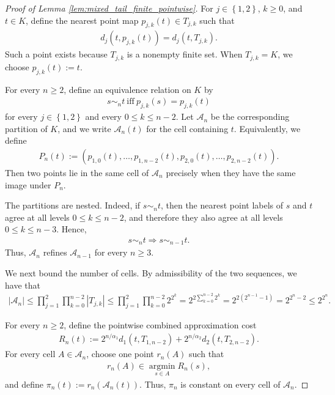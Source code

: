 \documentclass[10pt,a4paper]{amsart}
\newcommand{\cbr}[1]{\left\{#1\right\}}
\newcommand{\rbr}[1]{\left(#1\right)}
\begin{document}
\begin{proof}[Proof of Lemma
\ref{lem:mixed_tail_finite_pointwise}]
For $j\in\cbr{1,2}$, $k\ge0$, and $t\in K$, define the nearest point map $p_{j,k}(t)\in T_{j,k}$ such that
\begin{align*}
d_j(t,p_{j,k}(t))
=
d_j(t,T_{j,k}).
\end{align*}
Such a point exists because $T_{j,k}$ is a nonempty finite set. When
$T_{j,k}=K$, we choose $p_{j,k}(t):=t$.

For every $n\ge2$, define an equivalence relation on $K$ by
\begin{align*}
s\sim_n t\ \text{iff}\ p_{j,k}(s)=p_{j,k}(t)
\end{align*}
for every $j\in\cbr{1,2}$ and every $0\le k\le n-2$. Let
$\mathcal A_n$ be the corresponding partition of $K$, and we write
$\mathcal A_n(t)$ for the cell containing $t$. Equivalently, we define
\begin{align*}
P_n(t)
:=
\rbr{
p_{1,0}(t),\ldots,p_{1,n-2}(t),
p_{2,0}(t),\ldots,p_{2,n-2}(t)
}.
\end{align*}
Then two points lie in the same cell of $\mathcal A_n$ precisely when
they have the same image under $P_n$.

The partitions are nested. Indeed, if $s\sim_n t$, then the nearest
point labels of $s$ and $t$ agree at all levels $0\le k\le n-2$, and
therefore they also agree at all levels $0\le k\le n-3$. Hence,
\begin{align*}
s\sim_n t
\Rightarrow
s\sim_{n-1}t.
\end{align*}
Thus, $\mathcal A_n$ refines $\mathcal A_{n-1}$ for every $n\ge3$.

We next bound the number of cells. By admissibility of the two
sequences, we have that
\begin{align*}
|\mathcal A_n|\le
\prod_{j=1}^2
\prod_{k=0}^{n-2}
|T_{j,k}|\le
\prod_{j=1}^2
\prod_{k=0}^{n-2}
2^{2^k}=
2^{2\sum_{k=0}^{n-2}2^k}=
2^{2(2^{n-1}-1)}=
2^{2^n-2}\le
2^{2^n}.
\end{align*}

For every $n\ge2$, define the pointwise combined approximation cost
\begin{align*}
R_n(t)
:=
2^{n/\alpha_1}d_1(t,T_{1,n-2})
+
2^{n/\alpha_2}d_2(t,T_{2,n-2}).
\end{align*}
For every cell $A\in\mathcal A_n$, choose one point $r_n(A)$ such that
\begin{align*}
r_n(A)\in\operatorname*{argmin}_{s\in A}R_n(s),
\end{align*}
and define $\pi_n(t):=r_n(\mathcal A_n(t))$.
Thus, $\pi_n$ is constant on every cell of $\mathcal A_n$.


\end{proof}
\end{document}
